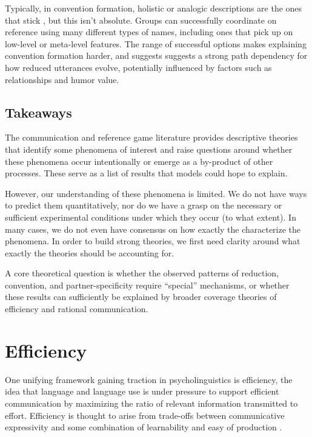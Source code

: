 \documentclass[]{article}
\begin{document}
Typically, in convention formation, holistic or analogic descriptions are the ones that stick \citep{clark1986}, but this isn't absolute. Groups can successfully coordinate on reference using many different types of names, including ones that pick up on low-level or meta-level features. The range of successful options makes explaining convention formation harder, and suggests  suggests a strong path dependency for how reduced utterances evolve, potentially influenced by factors such as relationships and humor value. 



\subsection{Takeaways} The communication and reference game literature provides descriptive theories that identify some phenomena of interest and raise questions around whether these phenomena occur intentionally or emerge as a by-product of other processes. These serve as a list of results that models could hope to explain. 

However, our understanding of these phenomena is limited. We do not have ways to predict them quantitatively, nor do we have a grasp on the necessary or sufficient experimental conditions under which they occur (to what extent). In many cases, we do not even have consensus on how exactly the characterize the phenomena. In order to build strong theories, we first need clarity around what exactly the theories should be accounting for. 

A core theoretical question is whether the observed patterns of reduction, convention, and partner-specificity require ``special'' mechanisms, or whether these results can sufficiently be explained by broader coverage theories of efficiency and rational communication. 


\section{Efficiency}
One unifying framework gaining traction in psycholinguistics is efficiency, the idea that language and language use is under pressure to support efficient communication by maximizing the ratio of relevant information transmitted to effort. Efficiency is thought to arise from trade-offs between communicative expressivity and some combination of learnability and easy of production \citep{piantadosi2012, kirby2015}. 
\end{document}
